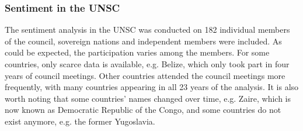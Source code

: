 \subsubsection{Sentiment in the UNSC}
The sentiment analysis in the UNSC was conducted on 182 individual members of the council, sovereign nations and independent members were included. As could be expected, the participation varies among the members. For some countries, only scarce data is available, e.g. Belize, which only took part in four years of council meetings. Other countries attended the council meetings more frequently, with many countries appearing in all 23 years of the analysis. It is also worth noting that some countries' names changed over time, e.g. Zaire, which is now known as Democratic Republic of the Congo, and some countries do not exist anymore, e.g. the former Yugoslavia.

